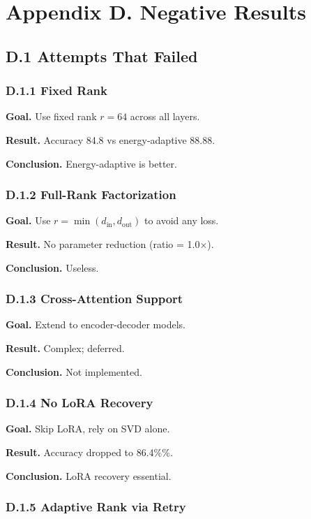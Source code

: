 
\section{Appendix D. Negative Results}

\subsection{D.1 Attempts That Failed}

\subsubsection{D.1.1 Fixed Rank}

\textbf{Goal.} Use fixed rank $r = 64$ across all layers.

\textbf{Result.} Accuracy 84.8 vs energy-adaptive 88.88.

\textbf{Conclusion.} Energy-adaptive is better.

\subsubsection{D.1.2 Full-Rank Factorization}

\textbf{Goal.} Use $r = \min(d_\text{in}, d_\text{out})$ to avoid any loss.

\textbf{Result.} No parameter reduction (ratio = 1.0$\times$).

\textbf{Conclusion.} Useless.

\subsubsection{D.1.3 Cross-Attention Support}

\textbf{Goal.} Extend to encoder-decoder models.

\textbf{Result.} Complex; deferred.

\textbf{Conclusion.} Not implemented.

\subsubsection{D.1.4 No LoRA Recovery}

\textbf{Goal.} Skip LoRA, rely on SVD alone.

\textbf{Result.} Accuracy dropped to 86.4\%\%.

\textbf{Conclusion.} LoRA recovery essential.

\subsubsection{D.1.5 Adaptive Rank via Retry}

